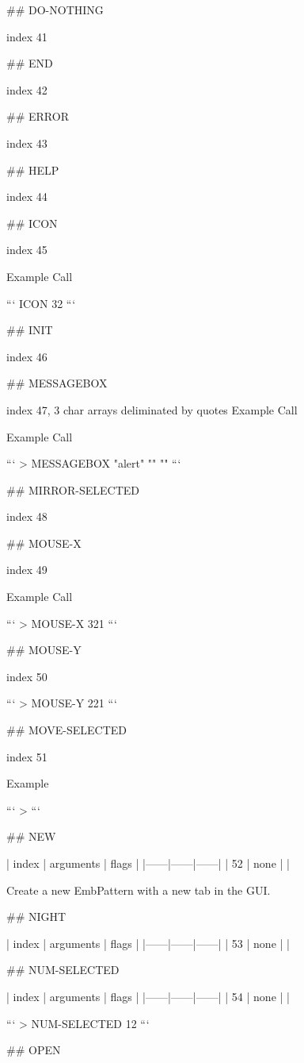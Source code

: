 ## DO-NOTHING

index 41



## END

index 42



## ERROR

index 43



## HELP

index 44



## ICON

index 45

Example Call

```
ICON 32
```

## INIT

index 46



## MESSAGEBOX

index 47, 3 char arrays deliminated by quotes Example Call

Example Call

```
> MESSAGEBOX "alert" "" ""
```

## MIRROR-SELECTED

index 48

## MOUSE-X

index 49

Example Call

```
> MOUSE-X
321
```

## MOUSE-Y

index 50

```
> MOUSE-Y
221
```

## MOVE-SELECTED

index 51

Example

```
> 
```

## NEW

| index | arguments | flags |
|------|------|------|
| 52 | none | |

Create a new EmbPattern with a new tab in the GUI.

## NIGHT

| index | arguments | flags |
|------|------|------|
| 53 | none | |



## NUM-SELECTED

| index | arguments | flags |
|------|------|------|
| 54 | none | |

```
> NUM-SELECTED
12
```

## OPEN

